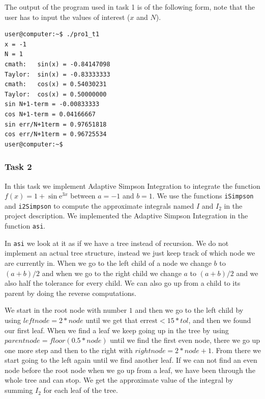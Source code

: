 \documentclass[a4paper,10pt]{article}
\newcommand{\e}{\text{e}}
\begin{document}
\FloatBarrier
\newpage
The output of the program used in task 1 is of the following form, note that the user has to input
the values of interest ($x$ and $N$).
\begin{center}
\begin{minipage}[t]{85mm}
\begin{lstlisting}
user@computer:~$ ./pro1_t1 
x = -1
N = 1
cmath:   sin(x) = -0.84147098
Taylor:  sin(x) = -0.83333333
cmath:   cos(x) = 0.54030231
Taylor:  cos(x) = 0.50000000
sin N+1-term = -0.00833333
cos N+1-term = 0.04166667
sin err/N+1term = 0.97651818
cos err/N+1term = 0.96725534
user@computer:~$ 
\end{lstlisting}
\end{minipage}
\end{center}

\subsubsection*{Task 2}
In this task we implement Adaptive Simpson Integration to integrate the function $f(x) = 1 + \sin \e ^{3x}$ between $a=-1$ and $b=1$. We use the functions \texttt{iSimpson} and \texttt{i2Simpson} to compute the approximate integrals named $I$ and $I_2$ in the project description. We implemented the Adaptive Simpson Integration in the function \texttt{asi}.

In \texttt{asi} we look at it as if we have a tree instead of recursion. We do not implement an actual tree structure, instead we just keep track of which node we are currently in. When we go to the left child of a node we change $b$ to $(a+b)/2$ and when we go to the right child we change $a$ to $(a+b)/2$ and we also half the tolerance for every child. We can also go up from a child to its parent by doing the reverse computations.

We start in the root node with number $1$ and then we go to the left child by using $leftnode = 2*node$ until we get that $\text{errest}<15*tol$, and then we found our first leaf. When we find a leaf we keep going up in the tree by using $parentnode = floor(0.5 * node)$ until we find the first even node, there we go up one more step and then to the right with $rightnode = 2*node+1$. From there we start going to the left again until we find another leaf. If we can not find an even node before the root node when we go up from a leaf, we have been through the whole tree and can stop. We get the approximate value of the integral by summing $I_2$ for each leaf of the tree.
\end{document}

